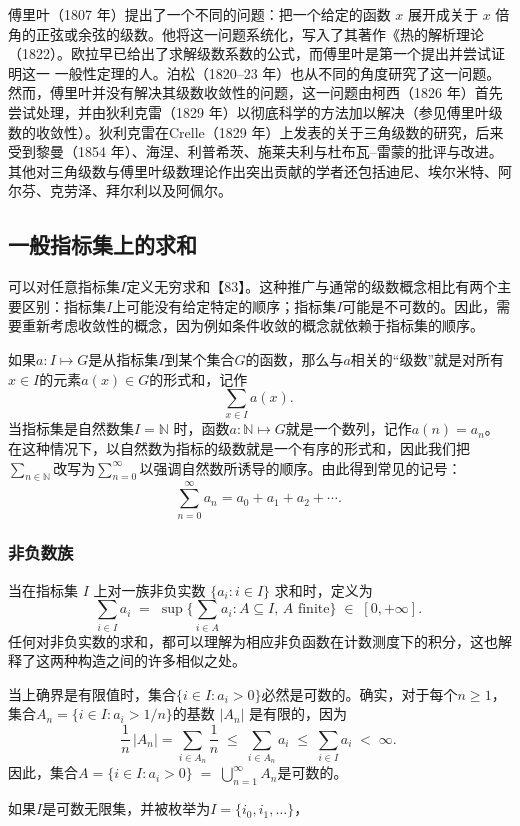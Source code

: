 傅里叶（1807 年）提出了一个不同的问题：把一个给定的函数 $x$ 展开成关于 $x$ 倍角的正弦或余弦的级数。他将这一问题系统化，写入了其著作《热的解析理论（1822）。欧拉早已给出了求解级数系数的公式，而傅里叶是第一个提出并尝试证明这一 一般性定理的人。泊松（1820–23 年）也从不同的角度研究了这一问题。然而，傅里叶并没有解决其级数收敛性的问题，这一问题由柯西（1826 年）首先尝试处理，并由狄利克雷（1829 年）以彻底科学的方法加以解决（参见傅里叶级数的收敛性）。狄利克雷在Crelle（1829 年）上发表的关于三角级数的研究，后来受到黎曼（1854 年）、海涅、利普希茨、施莱夫利与杜布瓦–雷蒙的批评与改进。其他对三角级数与傅里叶级数理论作出突出贡献的学者还包括迪尼、埃尔米特、阿尔芬、克劳泽、拜尔利以及阿佩尔。
\subsection{一般指标集上的求和}
可以对任意指标集$I$定义无穷求和【83】。这种推广与通常的级数概念相比有两个主要区别：指标集$I$上可能没有给定特定的顺序；指标集$I$可能是不可数的。因此，需要重新考虑收敛性的概念，因为例如条件收敛的概念就依赖于指标集的顺序。

如果$a: I \mapsto G$是从指标集$I$到某个集合$G$的函数，那么与$a$相关的“级数”就是对所有$x \in I$的元素$a(x) \in G$的形式和，记作
$$
\sum_{x \in I} a(x).~
$$
当指标集是自然数集$I = \mathbb{N}$ 时，函数$a: \mathbb{N} \mapsto G$就是一个数列，记作$a(n) = a_{n}$。在这种情况下，以自然数为指标的级数就是一个有序的形式和，因此我们把$\sum_{n \in \mathbb{N}}$改写为$\sum_{n=0}^{\infty}$以强调自然数所诱导的顺序。由此得到常见的记号：
$$
\sum_{n=0}^{\infty} a_{n} = a_{0} + a_{1} + a_{2} + \cdots .~
$$
\subsubsection{非负数族}
当在指标集 $I$ 上对一族非负实数 $\{a_{i}: i \in I\}$ 求和时，定义为
$$
\sum_{i \in I} a_{i} \;=\; \sup \Biggl\{ \sum_{i \in A} a_{i} : A \subseteq I, \, A \text{ finite} \Biggr\} \;\in\; [0, +\infty].~
$$
任何对非负实数的求和，都可以理解为相应非负函数在计数测度下的积分，这也解释了这两种构造之间的许多相似之处。

当上确界是有限值时，集合$\{i \in I : a_{i} > 0\}$必然是可数的。确实，对于每个$n \geq 1$，集合$A_{n} = \{i \in I : a_{i} > 1/n\}$的基数 $|A_{n}|$ 是有限的，因为
$$
\frac{1}{n}\,|A_{n}| = \sum_{i \in A_{n}} \frac{1}{n} \;\leq\; \sum_{i \in A_{n}} a_{i} \;\leq\; \sum_{i \in I} a_{i} \;<\; \infty.~
$$
因此，集合$A = \{i \in I : a_{i} > 0\} \;=\; \bigcup_{n=1}^{\infty} A_{n}$是可数的。

如果$I$是可数无限集，并被枚举为$I = \{i_{0}, i_{1}, \ldots\}$，

